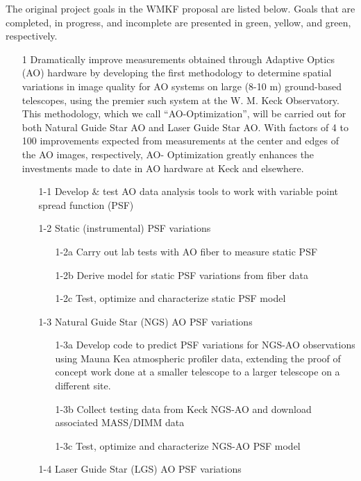 The original project goals in the WMKF proposal are listed below. Goals that are completed, in progress, and incomplete are presented in green, yellow, and green, respectively.

\begin{itemize}
\item[1] Dramatically improve measurements obtained through Adaptive Optics (AO) hardware by developing the first methodology to determine spatial variations in image quality for AO systems on large (8-10 m) ground-based telescopes, using the premier such system at the W. M. Keck Observatory. This methodology, which we call “AO-Optimization”, will be carried out for both Natural Guide Star AO and Laser Guide Star AO. With factors of 4 to 100 improvements expected from measurements at the center and edges of the AO images, respectively, AO- Optimization greatly enhances the investments made to date in AO hardware at Keck and elsewhere.
    \begin{itemize}
    \item[1-1] Develop & test AO data analysis tools to work with variable point spread function (PSF)
    \item[1-2] Static (instrumental) PSF variations
        \begin{itemize}
        \item[1-2a] Carry out lab tests with AO fiber to measure static PSF
        \item[1-2b] Derive model for static PSF variations from fiber data 
        \item[1-2c] Test, optimize and characterize static PSF model
        \end{itemize}
    \item[1-3] Natural Guide Star (NGS) AO PSF variations
        \begin{itemize}
        \item[1-3a] Develop code to predict PSF variations for NGS-AO observations
            using Mauna Kea atmospheric profiler data, extending the proof of concept 
            work done at a smaller telescope to a larger telescope on a different site.
        \item[1-3b] Collect testing data from Keck NGS-AO and download associated MASS/DIMM data
        \item[1-3c] Test, optimize and characterize NGS-AO PSF model
        \end{itemize}
    \item[1-4] Laser Guide Star (LGS) AO PSF variations

\end{itemize}
\end{itemize}
